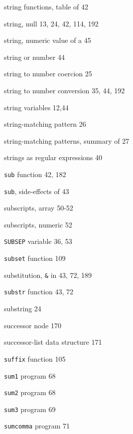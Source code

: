 \begin{multicols}{3}
\hangindent=3pc  string functions, table of 42

\hangindent=3pc  string, null 13, 24, 42, 114, 192

\hangindent=3pc  string, numeric value of a 45

\hangindent=3pc  string or number 44

\hangindent=3pc  string to number coercion 25

\hangindent=3pc  string to number conversion 35, 44, 192

\hangindent=3pc  string variables 12,44

\hangindent=3pc  string-matching pattern 26

\hangindent=3pc  string-matching patterns, summary of 27

\hangindent=3pc  strings as regular expressions 40

\hangindent=3pc  \verb'sub' function 42, 182

\hangindent=3pc  \verb'sub', side-effects of 43

\hangindent=3pc  subscripts, array 50-52

\hangindent=3pc  subscripts, numeric 52

\hangindent=3pc  \verb'SUBSEP' variable 36, 53

\hangindent=3pc  \verb'subset' function 109

\hangindent=3pc  substitution, \verb'&' in 43, 72, 189

\hangindent=3pc  \verb'substr' function 43, 72

\hangindent=3pc  substring 24

\hangindent=3pc  successor node 170

\hangindent=3pc  successor-list data structure 171

\hangindent=3pc  \verb'suffix' function 105







\hangindent=3pc  \verb'sum1' program 68

\hangindent=3pc  \verb'sum2' program 68

\hangindent=3pc  \verb'sum3' program 69

\hangindent=3pc  \verb'sumcomma' program 71


\end{multicols}
